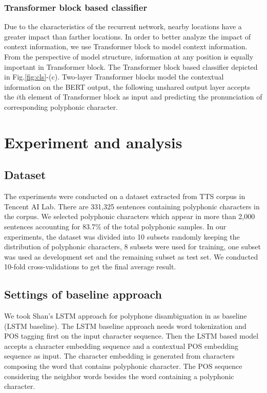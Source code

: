 \documentclass[a4paper]{article}
\begin{document}
\subsubsection{Transformer block based classifier}


Due to the characteristics of the recurrent network, nearby locations have a greater impact than farther locations. In order to better analyze the impact of context information, we use Transformer block to model context information. From the perspective of model structure, information at any position is equally important in Transformer block. The Transformer block based classifier depicted in Fig.\ref{fig:cls}-(c). Two-layer Transformer blocks model the contextual information on the BERT output, the following unshared output layer accepts the $i$th element of Transformer block as input and predicting the pronunciation of corresponding polyphonic character.



\section{Experiment and analysis}

\subsection{Dataset}

The experiments were conducted on a dataset extracted from TTS corpus in Tencent AI Lab. There  are 331,325 sentences containing polyphonic characters in the corpus. We selected polyphonic characters which appear in more than 2,000 sentences accounting for 83.7\% of the total polyphonic samples.  In our experiments, the dataset was divided into 10 subsets randomly keeping the distribution of polyphonic characters, 8 subsets were used for training, one subset was used as development set and the remaining subset as test set. We conducted 10-fold cross-validations to get the final average result.

\subsection{Settings of baseline approach}

We took Shan's LSTM approach for polyphone disambiguation  in \cite{shan2016bi} as baseline (LSTM baseline). The LSTM baseline approach needs word tokenization and POS tagging first on the input character sequence. Then the LSTM based model accepts a character embedding sequence and a contextual POS embedding sequence as input. The character embedding is generated from characters composing the word that contains polyphonic character. The POS sequence considering the neighbor words besides the word containing a polyphonic character.
\end{document}
